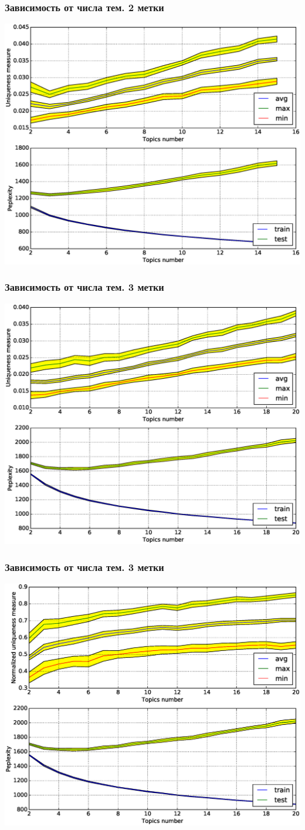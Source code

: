 \documentclass[utf8]{beamer}
\begin{document}
	\begin{frame}	
	\frametitle{Зависимость от числа тем. 2 метки}
	\includegraphics[width=0.75\linewidth]{presentation_pictures/topics_dependency_origin_2_ums.eps} 
	\end{frame}
	
	\begin{frame}	
	\frametitle{Зависимость от числа тем. 3 метки}
	\includegraphics[width=0.75\linewidth]{presentation_pictures/topics_dependency_origin_3_ums.eps} 
	\end{frame}
	
	
	\begin{frame}	
	\frametitle{Зависимость от числа тем. 3 метки}
	\includegraphics[width=0.75\linewidth]{presentation_pictures/topics_dependency_origin_3_nums.eps} 
	\end{frame}
	
\end{document}
